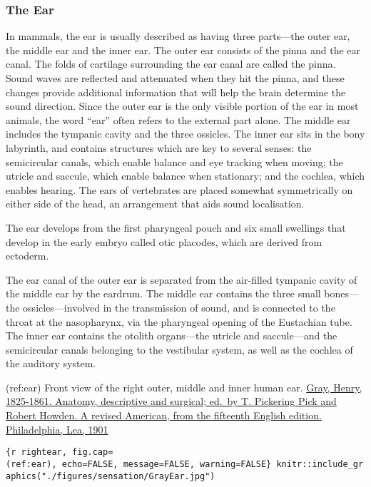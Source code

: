 \hypertarget{the-ear}{%
\subsubsection{The Ear}\label{the-ear}}

In mammals, the ear is usually described as having three parts---the
outer ear, the middle ear and the inner ear. The outer ear consists of
the pinna and the ear canal. The folds of cartilage surrounding the ear
canal are called the pinna. Sound waves are reflected and attenuated
when they hit the pinna, and these changes provide additional
information that will help the brain determine the sound direction.
Since the outer ear is the only visible portion of the ear in most
animals, the word ``ear'' often refers to the external part alone. The
middle ear includes the tympanic cavity and the three ossicles. The
inner ear sits in the bony labyrinth, and contains structures which are
key to several senses: the semicircular canals, which enable balance and
eye tracking when moving; the utricle and saccule, which enable balance
when stationary; and the cochlea, which enables hearing. The ears of
vertebrates are placed somewhat symmetrically on either side of the
head, an arrangement that aids sound localisation.

The ear develops from the first pharyngeal pouch and six small swellings
that develop in the early embryo called otic placodes, which are derived
from ectoderm.

The ear canal of the outer ear is separated from the air-filled tympanic
cavity of the middle ear by the eardrum. The middle ear contains the
three small bones---the ossicles---involved in the transmission of
sound, and is connected to the throat at the nasopharynx, via the
pharyngeal opening of the Eustachian tube. The inner ear contains the
otolith organs---the utricle and saccule---and the semicircular canals
belonging to the vestibular system, as well as the cochlea of the
auditory system.

(ref:ear) Front view of the right outer, middle and inner human ear.
\href{https://archive.org/details/anatomydescripti00grayuoft/page/n6/mode/2up}{Gray,
Henry, 1825-1861. Anatomy, descriptive and surgical; ed.~by T. Pickering
Pick and Robert Howden. A revised American, from the fifteenth English
edition. Philadelphia, Lea, 1901}

\texttt{\{r\ rightear,\ fig.cap=\textquotesingle{}(ref:ear)\textquotesingle{},\ echo=FALSE,\ message=FALSE,\ warning=FALSE\}\ knitr::include\_graphics("./figures/sensation/GrayEar.jpg")}

